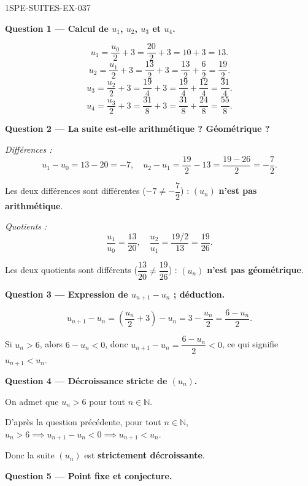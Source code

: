 \begin{corrige}{1SPE-SUITES-EX-037}

\textbf{Question 1 — Calcul de $u_1$, $u_2$, $u_3$ et $u_4$.}

\[
  u_1 = \frac{u_0}{2} + 3 = \frac{20}{2} + 3 = 10 + 3 = 13.
\]
\[
  u_2 = \frac{u_1}{2} + 3 = \frac{13}{2} + 3 = \frac{13}{2} + \frac{6}{2} = \frac{19}{2}.
\]
\[
  u_3 = \frac{u_2}{2} + 3 = \frac{19}{4} + 3 = \frac{19}{4} + \frac{12}{4} = \frac{31}{4}.
\]
\[
  u_4 = \frac{u_3}{2} + 3 = \frac{31}{8} + 3 = \frac{31}{8} + \frac{24}{8} = \frac{55}{8}.
\]

\medskip
\textbf{Question 2 — La suite est-elle arithmétique ? Géométrique ?}

\textit{Différences :}
\[
  u_1 - u_0 = 13 - 20 = -7, \quad u_2 - u_1 = \frac{19}{2} - 13 = \frac{19 - 26}{2} = -\frac{7}{2}.
\]

Les deux différences sont différentes ($-7
\neq -\dfrac{7}{2}$) : $(u_n)$ \textbf{n'est pas arithmétique}.

\textit{Quotients :}
\[
  \frac{u_1}{u_0} = \frac{13}{20}, \quad \frac{u_2}{u_1} = \frac{19/2}{13} = \frac{19}{26}.
\]

Les deux quotients sont différents ($\dfrac{13}{20}
\neq \dfrac{19}{26}$) : $(u_n)$ \textbf{n'est pas géométrique}.


\medskip
\textbf{Question 3 — Expression de $u_{n+1} - u_n$ ; déduction.}

\[
  u_{n+1} - u_n = \left(\frac{u_n}{2} + 3\right) - u_n = 3 - \frac{u_n}{2} = \frac{6 - u_n}{2}.
\]

Si $u_n > 6$, alors $6 - u_n < 0$, donc $u_{n+1} - u_n = \dfrac{6 - u_n}{2} < 0$, ce qui signifie $u_{n+1} < u_n$.


\medskip
\textbf{Question 4 — Décroissance stricte de $(u_n)$.}

On admet que $u_n > 6$ pour tout $n \in \mathbb{N}$.

D'après la question précédente, pour tout $n \in \mathbb{N}$, $u_n > 6 \implies u_{n+1} - u_n < 0 \implies u_{n+1} < u_n$.

Donc la suite $(u_n)$ est \textbf{strictement décroissante}.

\medskip
\textbf{Question 5 — Point fixe et conjecture.}


\end{corrige}
